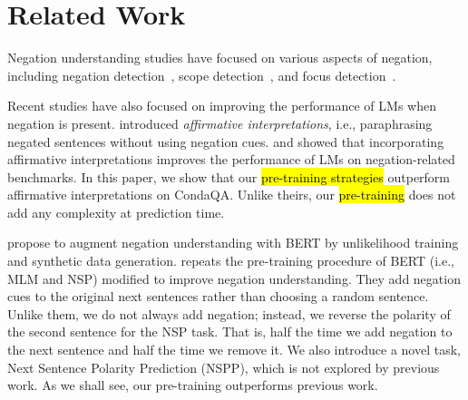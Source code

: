 \section{Related Work}
\label{sec:related_work}

Negation understanding studies have focused on various aspects of negation, 
including negation detection~\cite{khandelwal-sawant-2020-negbert,truong-etal-2022-improving,morante-daelemans-2012-conandoyle},
scope detection~\cite{qian-etal-2016-speculation,jumelet-hupkes-2018-language,fancellu-etal-2017-detecting,morante-daelemans-2009-metalearning,li-lu-2018-learning,zhao-bethard-2020-berts}, and
focus detection~\cite{rosenberg-bergler-2012-uconcordia,shen-etal-2019-negative,zou-etal-2014-negation,zou-etal-2015-unsupervised}.

Recent studies have also focused on improving the performance of LMs when negation is present.
\citet{sarabi-etal-2019-corpus} introduced \emph{affirmative interpretations}, 
i.e., paraphrasing negated sentences without using negation cues.
\citet{hossain-blanco-2022-leveraging}
and 
\citet{rezaei2024paraphrasing}
showed that incorporating affirmative interpretations improves the performance of LMs
on negation-related benchmarks. 
In this paper, we show that our \hl{pre-training strategies} outperform affirmative interpretations on CondaQA. 
Unlike theirs, our \hl{pre-training} does not add any complexity at prediction time.


\citet{hosseini-etal-2021-understanding} propose to augment negation understanding with {BERT} by unlikelihood training and synthetic data generation.
\citet{singh-etal-2023-nlms} repeats the pre-training procedure of {BERT} (i.e., MLM and NSP) modified to improve negation understanding.
They add negation cues to the original next sentences rather than choosing a random sentence.
Unlike them, we do not always add negation; instead, we reverse the polarity of the second sentence for the NSP task.
That is, half the time we add negation to the next sentence and half the time we remove it.
We also introduce a novel task, 
Next Sentence Polarity Prediction (NSPP),
which is not explored by previous work.
As we shall see,
our pre-training outperforms previous work.